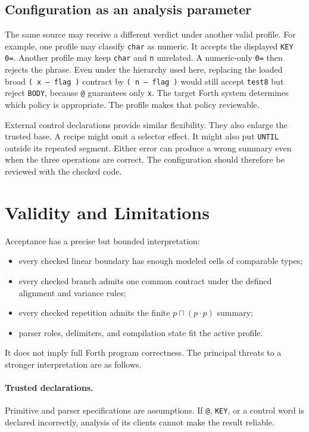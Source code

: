 \documentclass[11pt,a4paper]{article}
\newcommand{\effect}[1]{\mbox{\texttt{#1}}}
\newcommand{\meet}{\mathbin{\sqcap}}
\newcommand{\seq}{\mathbin{\cdot}}
\begin{document}
\subsection{Configuration as an analysis parameter}

The same source may receive a different verdict under another valid profile.
For example, one profile may classify \texttt{char} as numeric.  It accepts
the displayed \texttt{KEY 0=}.  Another profile may keep \texttt{char} and
\texttt{n} unrelated.  A numeric-only \texttt{0=} then rejects the phrase.
Even under the hierarchy used here, replacing the loaded broad
\effect{( x -- flag )} contract by \effect{( n -- flag )} would still accept
\texttt{test8} but reject \texttt{BODY}, because \texttt{@} guarantees only
\texttt{x}.  The target Forth system determines which policy is appropriate.
The profile makes that policy reviewable.

External control declarations provide similar flexibility.  They also enlarge
the trusted base.  A recipe might omit a selector effect.  It might also put
\texttt{UNTIL} outside its repeated segment.  Either error can produce a wrong
summary even when the three operations are correct.  The configuration should
therefore be reviewed with the checked code.

\section{Validity and Limitations}
\label{sec:limits}

Acceptance has a precise but bounded interpretation:
\begin{itemize}
  \item every checked linear boundary has enough modeled cells of comparable
        types;
  \item every checked branch admits one common contract under the defined
        alignment and variance rules;
  \item every checked repetition admits the finite $p\meet(p\seq p)$ summary;
  \item parser roles, delimiters, and compilation state fit the active profile.
\end{itemize}
It does not imply full Forth program correctness.  The principal threats to a
stronger interpretation are as follows.

\paragraph{Trusted declarations.}
Primitive and parser specifications are assumptions.  If \texttt{@},
\texttt{KEY}, or a control word is declared incorrectly, analysis of its
clients cannot make the result reliable.
\end{document}
